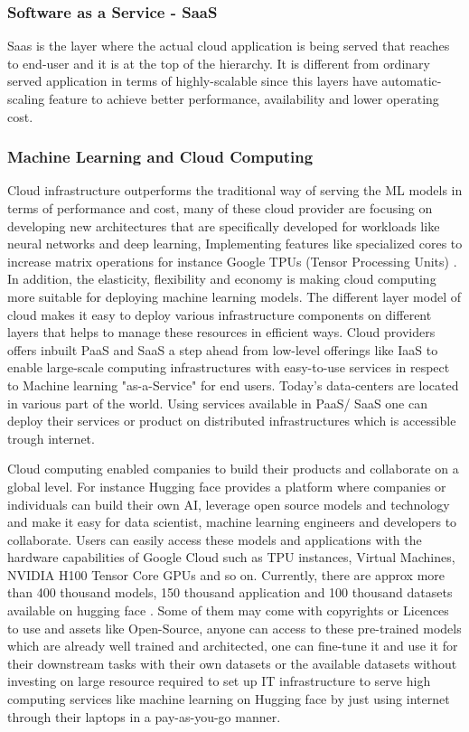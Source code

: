\subsubsection{Software as a Service - SaaS}

Saas is the layer where the actual cloud application is being served that reaches to end-user and it is at the top of the hierarchy. It is different from ordinary served application in terms of highly-scalable since this layers have automatic-scaling feature to achieve better performance, availability and lower operating cost.

\subsubsection{Machine Learning and Cloud Computing}

Cloud infrastructure outperforms the traditional way of serving the ML models in terms of performance and cost, many of these cloud provider are focusing on developing new architectures that are specifically developed for workloads like neural networks and deep learning, Implementing features like specialized cores to increase matrix operations for instance Google TPUs (Tensor Processing Units) \cite{google_tpu}. In addition, the elasticity, flexibility and economy is making cloud computing more suitable for deploying machine learning models. The different layer model of cloud makes it easy to deploy various infrastructure components on different layers that helps to manage these resources in efficient ways. Cloud providers offers inbuilt PaaS and SaaS a step ahead from low-level offerings like IaaS to enable large-scale computing infrastructures with easy-to-use services in respect to Machine learning "as-a-Service" for end users. Today's data-centers are located in various part of the world. Using services available in PaaS/ SaaS one can deploy their services or product on distributed infrastructures which is accessible trough internet. 

Cloud computing enabled companies to build their products and collaborate on a global level. For instance Hugging face \cite{huggingfacehub} provides a platform where companies or individuals can build their own AI, leverage open source models and technology and make it easy for data scientist, machine learning engineers and developers to collaborate. Users can easily access these models and applications with the hardware capabilities of Google Cloud \cite{Googlecloud} such as TPU instances, Virtual Machines, NVIDIA H100 Tensor Core GPUs \cite{Nvidiagpu} and so on. Currently, there are approx more than 400 thousand models, 150 thousand application and 100 thousand datasets available on hugging face \cite{huggingfacehub}. Some of them may come with copyrights or Licences to use and assets like  Open-Source, anyone can access to these pre-trained models which are already well trained and architected, one can fine-tune it and use it for their downstream tasks with their own datasets or the available datasets without investing on large resource required to set up IT infrastructure to serve high computing services like machine learning on Hugging face by just using internet through their laptops in a pay-as-you-go manner.
